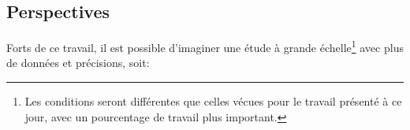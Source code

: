














\subsection{Perspectives}
Forts de ce travail, il est possible d'imaginer une étude à  grande
échelle\footnote{Les conditions seront différentes que celles vécues pour le
travail présenté à ce jour, avec un pourcentage de travail plus
important.} avec plus de données et précisions, soit:

